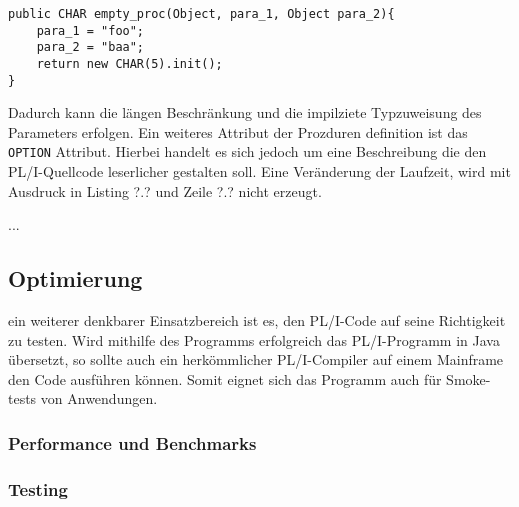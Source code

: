 \begin{verbatim}
public CHAR empty_proc(Object, para_1, Object para_2){
	para_1 = "foo";
	para_2 = "baa";
	return new CHAR(5).init();
}
\end{verbatim} 

Dadurch kann die längen Beschränkung und die impilziete Typzuweisung des Parameters erfolgen.
Ein weiteres Attribut der Prozduren definition ist das \verb+OPTION+ Attribut.
Hierbei handelt es sich jedoch um eine Beschreibung die den PL/I-Quellcode leserlicher gestalten soll.
Eine Veränderung der Laufzeit, wird mit Ausdruck in Listing ?.? und Zeile ?.? nicht erzeugt.

... 


\subsection{Optimierung}
ein weiterer denkbarer Einsatzbereich ist es, den PL/I-Code auf seine Richtigkeit zu testen. Wird mithilfe des Programms erfolgreich das PL/I-Programm in Java übersetzt, so sollte auch ein herkömmlicher PL/I-Compiler auf einem Mainframe den Code ausführen können. Somit eignet sich das Programm auch für Smoke-tests von Anwendungen.
\subsubsection{Performance und Benchmarks}
\subsubsection{Testing}
